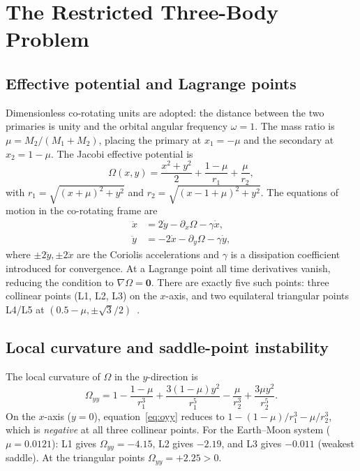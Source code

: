 \documentclass[10pt,twocolumn]{article}
\begin{document}
\section{The Restricted Three-Body Problem}

\subsection{Effective potential and Lagrange points}

Dimensionless co-rotating units are adopted: the distance between the two
primaries is unity and the orbital angular frequency $\omega=1$.
The mass ratio is $\mu=M_2/(M_1+M_2)$, placing the primary at $x_1=-\mu$
and the secondary at $x_2=1-\mu$.
The Jacobi effective potential is
\begin{equation}
  \Omega(x,y)
  = \frac{x^2+y^2}{2}
  + \frac{1-\mu}{r_1}
  + \frac{\mu}{r_2},
  \label{eq:omega}
\end{equation}
with $r_1=\sqrt{(x+\mu)^2+y^2}$ and $r_2=\sqrt{(x-1+\mu)^2+y^2}$.
The equations of motion in the co-rotating frame are
\begin{align}
  \ddot{x} &=  2\dot{y} - \partial_x\Omega - \gamma\dot{x},
  \label{eq:eomx}\\
  \ddot{y} &= -2\dot{x} - \partial_y\Omega - \gamma\dot{y},
  \label{eq:eomy}
\end{align}
where $\pm2\dot{y},\pm2\dot{x}$ are the Coriolis accelerations and $\gamma$ is
a dissipation coefficient introduced for convergence.
At a Lagrange point all time derivatives vanish, reducing the condition to
$\nabla\Omega=\mathbf{0}$.
There are exactly five such points: three collinear points (L1, L2, L3) on
the $x$-axis, and two equilateral triangular points
L4/L5 at $(0.5-\mu,\pm\sqrt{3}/2)$~\cite{lagrange1772,szebehely1967}.

\subsection{Local curvature and saddle-point instability}

The local curvature of $\Omega$ in the $y$-direction is
\begin{equation}
  \Omega_{yy}
  = 1
  - \frac{1-\mu}{r_1^3}
  + \frac{3(1-\mu)y^2}{r_1^5}
  - \frac{\mu}{r_2^3}
  + \frac{3\mu y^2}{r_2^5}.
  \label{eq:oyy}
\end{equation}
On the $x$-axis ($y=0$), equation~\eqref{eq:oyy} reduces to
$1-(1-\mu)/r_1^3-\mu/r_2^3$, which is \emph{negative} at all three collinear
points.
For the Earth--Moon system ($\mu=0.0121$): L1 gives $\Omega_{yy}=-4.15$,
L2 gives $-2.19$, and L3 gives $-0.011$ (weakest saddle).
At the triangular points $\Omega_{yy}=+2.25>0$.
\end{document}
